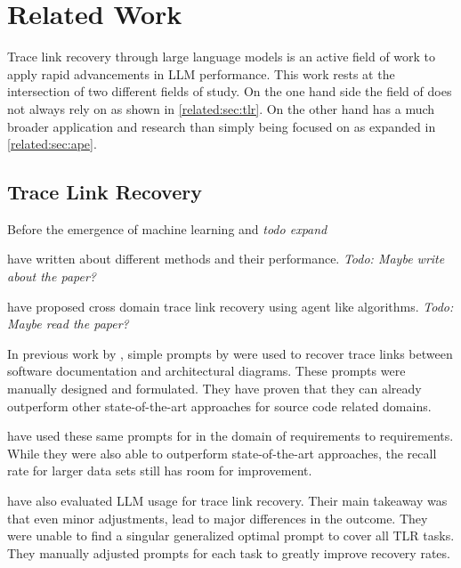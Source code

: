 \chapter{Related Work}
Trace link recovery through large language models is an active field of work to apply rapid advancements in LLM performance.
This work rests at the intersection of two different fields of study. On the one hand side the field of \TLR does not always rely on \LLMs as shown in \autoref{related:sec:tlr}. On the other hand \APE has a much broader application and research than simply being focused on \TLR as expanded in \autoref{related:sec:ape}.


\section{Trace Link Recovery}
\label{related:sec:tlr}

Before the emergence of machine learning and \LLMs \textit{todo expand}

 have written about different \IR methods and their performance. \textit{Todo: Maybe write about the paper?}


 have proposed cross domain trace link recovery using agent like algorithms. \textit{Todo: Maybe read the paper?}



In previous work by , simple prompts by  were used to recover trace links between software documentation and architectural diagrams. These prompts were manually designed and formulated. They have proven that they can already outperform other state-of-the-art approaches for source code related \TLR domains. 

 have used these same prompts for \TLR in the domain of requirements to requirements. While they were also able to outperform state-of-the-art approaches, the recall rate for larger data sets still has room for improvement.

 have also evaluated LLM usage for trace link recovery. Their main takeaway was that even minor adjustments,  lead to major differences in the outcome. They were unable to find a singular generalized optimal prompt to cover all TLR tasks. They manually adjusted prompts for each task to greatly improve recovery rates.


